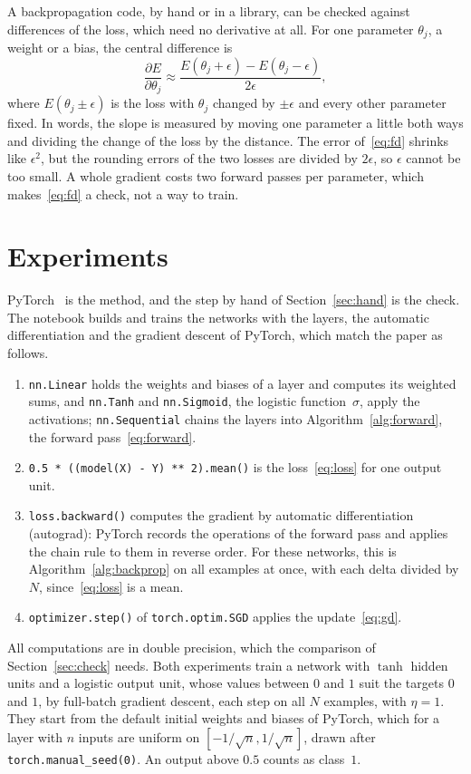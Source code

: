 \documentclass[11pt,a4paper]{amsart}
\numberwithin{equation}{section}
\theoremstyle{plain}
\theoremstyle{definition}
\theoremstyle{remark}
\newcommand{\code}[1]{\texttt{#1}}
\begin{document}
A backpropagation code, by hand or in a library, can be checked against
differences of the loss, which need no derivative at all. For one
parameter $\theta_j$, a weight or a bias, the central difference is
\begin{equation}\label{eq:fd}
  \frac{\partial E}{\partial \theta_j} \approx
  \frac{E(\theta_j + \epsilon) - E(\theta_j - \epsilon)}{2 \epsilon},
\end{equation}
where $E(\theta_j \pm \epsilon)$ is the loss with $\theta_j$ changed by
$\pm \epsilon$ and every other parameter fixed. In words, the slope is
measured by moving one parameter a little both ways and dividing the
change of the loss by the distance. The error of~\eqref{eq:fd} shrinks
like $\epsilon^2$, but the rounding errors of the two losses are divided
by $2 \epsilon$, so $\epsilon$ cannot be too small. A whole gradient
costs two forward passes per parameter, which makes~\eqref{eq:fd} a
check, not a way to train.

\section{Experiments}\label{sec:experiments}

PyTorch~\cite{paszke2019} is the method, and the step by hand of
Section~\ref{sec:hand} is the check. The notebook builds and trains the
networks with the layers, the automatic differentiation and the gradient
descent of PyTorch, which match the paper as follows.
\begin{enumerate}[leftmargin=*, nosep]
\item \code{nn.Linear} holds the weights and biases of a layer and
  computes its weighted sums, and \code{nn.Tanh} and \code{nn.Sigmoid},
  the logistic function~$\sigma$, apply the activations;
  \code{nn.Sequential} chains the layers into
  Algorithm~\ref{alg:forward}, the forward pass~\eqref{eq:forward}.
\item \mbox{\code{0.5 * ((model(X) - Y) ** 2).mean()}} is the
  loss~\eqref{eq:loss} for one output unit.
\item \code{loss.backward()} computes the gradient by automatic
  differentiation (autograd): PyTorch records the operations of the
  forward pass and applies the chain rule to them in reverse order. For
  these networks, this is Algorithm~\ref{alg:backprop} on all examples
  at once, with each delta divided by $N$, since~\eqref{eq:loss} is a
  mean.
\item \code{optimizer.step()} of \code{torch.optim.SGD} applies the
  update~\eqref{eq:gd}.
\end{enumerate}
All computations are in double precision, which the comparison of
Section~\ref{sec:check} needs. Both experiments train a network with
$\tanh$ hidden units and a logistic output unit, whose values between
$0$ and $1$ suit the targets $0$ and $1$, by full-batch gradient
descent, each step on all $N$ examples, with $\eta = 1$. They start from
the default initial weights and biases of PyTorch, which for a layer
with $n$ inputs are uniform on $[-1/\sqrt{n}, 1/\sqrt{n}]$, drawn after
\code{torch.manual\_seed(0)}. An output above $0.5$ counts as class~$1$.
\end{document}
